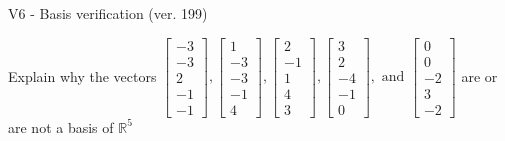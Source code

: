 \begin{exercise}
  \begin{exerciseTitle}V6 - Basis verification (ver. 199)\end{exerciseTitle}
  \begin{exerciseStatement}
    Explain why the vectors \(\left[\begin{array}{r}
-3 \\
-3 \\
2 \\
-1 \\
-1
\end{array}\right] , \left[\begin{array}{r}
1 \\
-3 \\
-3 \\
-1 \\
4
\end{array}\right] , \left[\begin{array}{r}
2 \\
-1 \\
1 \\
4 \\
3
\end{array}\right] , \left[\begin{array}{r}
3 \\
2 \\
-4 \\
-1 \\
0
\end{array}\right] , \text{ and } \left[\begin{array}{r}
0 \\
0 \\
-2 \\
3 \\
-2
\end{array}\right]\) are or are not a basis of \(\mathbb{R}^5\)	



\end{exerciseStatement}
\end{exercise}
